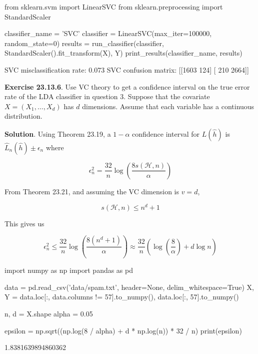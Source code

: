 \begin{python}
from sklearn.svm import LinearSVC
from sklearn.preprocessing import StandardScaler

classifier_{n}ame = 'SVC'
classifier = LinearSVC(max_{i}ter=100000, random_state=0)
results = run_classifier(classifier, StandardScaler().fit_transform(X), Y)
print_results(classifier_{n}ame, results)
\end{python}

\begin{console}
SVC misclassification rate: 0.073
SVC confusion matrix:
[[1603  124]
 [ 210 2664]]
\end{console}

\textbf{Exercise 23.13.6}. Use VC theory to get a confidence interval on
the true error rate of the LDA classifier in question 3. Suppose that
the covariate \(X = (X_{1}, \dots, X_d)\) has \(d\) dimensions. Assume
that each variable has a continuous distribution.

\textbf{Solution}. Using Theorem 23.19, a \(1 - \alpha\) confidence
interval for \(L(\hat{h})\) is \(\hat{L}_{n}(\hat{h}) \pm \epsilon_{n}\)
where

\[ \epsilon_{n}^{2} = \frac{32}{n} \log \left( \frac{8 s(\mathcal{H}, n)}{\alpha} \right) \]

From Theorem 23.21, and assuming the VC dimension is \(v = d\),

\[ s(\mathcal{H}, n) \leq n^{d} + 1 \]

This gives us

\[ \epsilon_{n}^{2} \leq \frac{32}{n} \log \left( \frac{8 (n^{d} + 1)}{\alpha} \right) \approx \frac{32}{n} \left( \log \left( \frac{8}{\alpha} \right) + d \log n\right) \]

\begin{python}
import numpy as np
import pandas as pd

data = pd.read_csv('data/spam.txt', header=None, delim_whitespace=True)
X, Y = data.loc[:, data.columns != 57].to_{n}umpy(), data.loc[:, 57].to_{n}umpy()
\end{python}

\begin{python}
n, d = X.shape
alpha = 0.05
\end{python}

\begin{python}
epsilon = np.sqrt((np.log(8 / alpha) + d * np.log(n)) * 32 / n)
print(epsilon)
\end{python}

\begin{console}
1.8381639894860362
\end{console}

